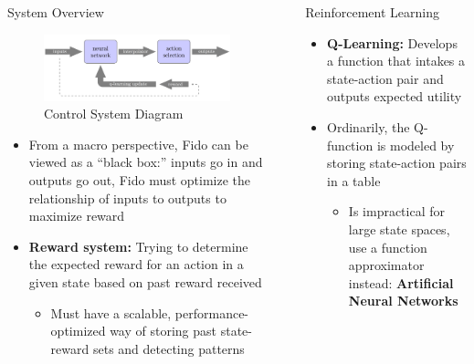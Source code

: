 \documentclass[final]{beamer}
\newlength{\sepwid}
\newlength{\onecolwid}
\newlength{\twocolwid}
\begin{document}
\begin{frame}[t]
\begin{columns}[t]
\begin{column}{\onecolwid}
	\begin{block}{System Overview}
		\begin{figure}
			\centering
			\includegraphics[width=\linewidth]{Figures/diagramRendered.png}
			\caption{Control System Diagram}
		\end{figure}
		\vspace{-1cm}
		\begin{itemize}
			\item From a macro perspective, Fido can be viewed as a ``black box:'' inputs go in and outputs go out, Fido must optimize the relationship of inputs to outputs to maximize reward
			\item  \textbf{Reward system:} Trying to determine the expected reward for an action in a given state based on past reward received
			\begin{itemize}
				\item Must have a scalable, performance-optimized way of storing past state-reward sets and detecting patterns
			\end{itemize}
		\end{itemize}
	\end{block}

\end{column}

\begin{column}{\sepwid}\end{column}

\begin{column}{\twocolwid}

\vspace{-1.65cm}

\begin{columns}[t,totalwidth=\twocolwid]

	\begin{column}{\onecolwid}
		\begin{block}{Reinforcement Learning}
			\begin{itemize}
				\item \textbf{Q-Learning:} Develops a function that intakes a state-action pair and outputs expected utility
				\item Ordinarily, the Q-function is modeled by storing state-action pairs in a table
				\begin{itemize}
					\item Is impractical for large state spaces, use a function approximator instead: \textbf{Artificial Neural Networks}
				\end{itemize}


\end{itemize}
\end{block}
\end{column}
\end{columns}
\end{column}
\end{columns}
\end{frame}
\end{document}
